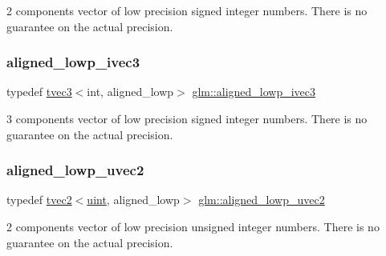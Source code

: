 2 components vector of low precision signed integer numbers. There is no guarantee on the actual precision. \mbox{\label{group__gtc__type__aligned_ga1d549dde64a05e6fcbc23a73563a077c}} 
\subsubsection{\texorpdfstring{aligned\+\_\+lowp\+\_\+ivec3}{aligned\_lowp\_ivec3}}
{\footnotesize\ttfamily typedef \hyperlink{structglm_1_1tvec3}{tvec3}$<$int, aligned\+\_\+lowp$>$ \hyperlink{group__gtc__type__aligned_ga1d549dde64a05e6fcbc23a73563a077c}{glm\+::aligned\+\_\+lowp\+\_\+ivec3}}

3 components vector of low precision signed integer numbers. There is no guarantee on the actual precision. \mbox{\label{group__gtc__type__aligned_gae35234d451a8160abf2915753e015269}} 
\subsubsection{\texorpdfstring{aligned\+\_\+lowp\+\_\+uvec2}{aligned\_lowp\_uvec2}}
{\footnotesize\ttfamily typedef \hyperlink{structglm_1_1tvec2}{tvec2}$<$\hyperlink{group__core__precision_ga4fd29415871152bfb5abd588334147c8}{uint}, aligned\+\_\+lowp$>$ \hyperlink{group__gtc__type__aligned_gae35234d451a8160abf2915753e015269}{glm\+::aligned\+\_\+lowp\+\_\+uvec2}}

2 components vector of low precision unsigned integer numbers. There is no guarantee on the actual precision. \mbox{\label{group__gtc__type__aligned_ga3d3b253d6dc1d1ac3b1732f65fd83901}} 
